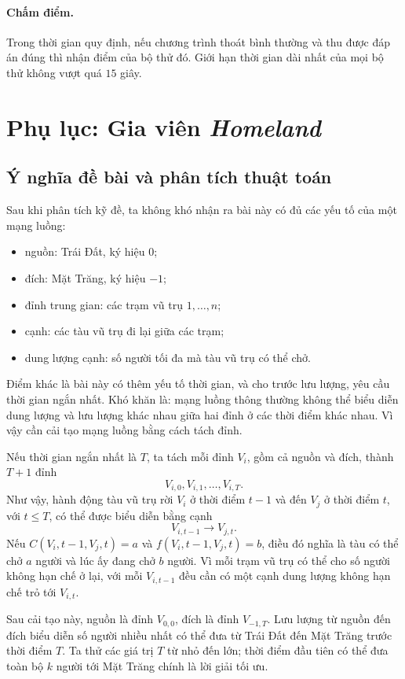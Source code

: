 \documentclass[11pt]{article}
\begin{document}
\paragraph{Chấm điểm.}
Trong thời gian quy định, nếu chương trình thoát bình thường và thu được đáp
án đúng thì nhận điểm của bộ thử đó. Giới hạn thời gian dài nhất của mọi bộ
thử không vượt quá \(15\) giây.

\section{Phụ lục: Gia viên \textit{Homeland}}

\subsection{Ý nghĩa đề bài và phân tích thuật toán}

Sau khi phân tích kỹ đề, ta không khó nhận ra bài này có đủ các yếu tố của
một mạng luồng:
\begin{itemize}
  \item nguồn: Trái Đất, ký hiệu \(0\);
  \item đích: Mặt Trăng, ký hiệu \(-1\);
  \item đỉnh trung gian: các trạm vũ trụ \(1,\ldots,n\);
  \item cạnh: các tàu vũ trụ đi lại giữa các trạm;
  \item dung lượng cạnh: số người tối đa mà tàu vũ trụ có thể chở.
\end{itemize}

Điểm khác là bài này có thêm yếu tố thời gian, và cho trước lưu lượng, yêu
cầu thời gian ngắn nhất. Khó khăn là: mạng luồng thông thường không thể biểu
diễn dung lượng và lưu lượng khác nhau giữa hai đỉnh ở các thời điểm khác
nhau. Vì vậy cần cải tạo mạng luồng bằng cách tách đỉnh.

Nếu thời gian ngắn nhất là \(T\), ta tách mỗi đỉnh \(V_i\), gồm cả nguồn và
đích, thành \(T+1\) đỉnh
\[
  V_{i,0},V_{i,1},\ldots,V_{i,T}.
\]
Như vậy, hành động tàu vũ trụ rời \(V_i\) ở thời điểm \(t-1\) và đến
\(V_j\) ở thời điểm \(t\), với \(t\le T\), có thể được biểu diễn bằng cạnh
\[
  V_{i,t-1}\to V_{j,t}.
\]
Nếu \(C(V_i,t-1,V_j,t)=a\) và \(f(V_i,t-1,V_j,t)=b\), điều đó nghĩa là tàu có
thể chở \(a\) người và lúc ấy đang chở \(b\) người. Vì mỗi trạm vũ trụ có thể
cho số người không hạn chế ở lại, với mỗi \(V_{i,t-1}\) đều cần có một cạnh
dung lượng không hạn chế trỏ tới \(V_{i,t}\).

Sau cải tạo này, nguồn là đỉnh \(V_{0,0}\), đích là đỉnh \(V_{-1,T}\). Lưu
lượng từ nguồn đến đích biểu diễn số người nhiều nhất có thể đưa từ Trái Đất
đến Mặt Trăng trước thời điểm \(T\). Ta thử các giá trị \(T\) từ nhỏ đến lớn;
thời điểm đầu tiên có thể đưa toàn bộ \(k\) người tới Mặt Trăng chính là lời
giải tối ưu.
\end{document}
